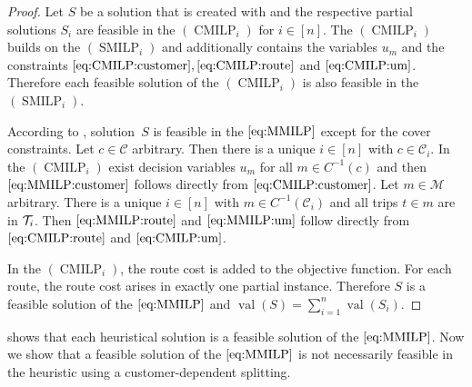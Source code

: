 \begin{proof}

Let $S$ be a solution that is created with  and the respective partial solutions $S_i$ are feasible in the $(\operatorname{CMILP}_i)$ for ${i\in[n]}$. The $(\operatorname{CMILP}_i)$ builds on the $(\operatorname{SMILP}_i)$ and additionally contains the variables $u_m$ and the constraints $\eqref{eq:CMILP:customer}, \eqref{eq:CMILP:route}$ and $\eqref{eq:CMILP:um}$. Therefore each feasible solution of the $(\operatorname{CMILP}_i)$ is also feasible in the $(\operatorname{SMILP}_i)$.

According to , solution~$S$ is feasible in the $\eqref{eq:MMILP}$ except for the cover constraints. Let $c\in\mathcal{C}$ arbitrary. Then there is a unique $i\in[n]$ with ${c\in\mathcal{C}_i}$. In the $(\operatorname{CMILP}_i)$ exist decision variables $u_m$ for all ${m\in C^{-1}(c)}$ and then $\eqref{eq:MMILP:customer}$ follows directly from $\eqref{eq:CMILP:customer}$. Let ${m\in\mathcal{M}}$ arbitrary. There is a unique ${i\in[n]}$ with ${m\in C^{-1}(\mathcal{C}_i)}$ and all trips ${t\in m}$ are in $\mathcal{T}_i$. Then $\eqref{eq:MMILP:route}$ and $\eqref{eq:MMILP:um}$ follow directly from $\eqref{eq:CMILP:route}$ and $\eqref{eq:CMILP:um}$. 

In the $(\operatorname{CMILP}_i)$, the route cost is added to the objective function. For each route, the route cost arises in exactly one partial instance. Therefore $S$ is a feasible solution of the $\eqref{eq:MMILP}$ and ${\operatorname{val}(S) = \sum_{i=1}^n\operatorname{val}\left(S_i\right)}$.
%
\end{proof}

 shows that each heuristical solution is a feasible solution of the $\eqref{eq:MMILP}$. Now we show that a feasible solution of the $\eqref{eq:MMILP}$ is not necessarily feasible in the heuristic using a customer-dependent splitting.

